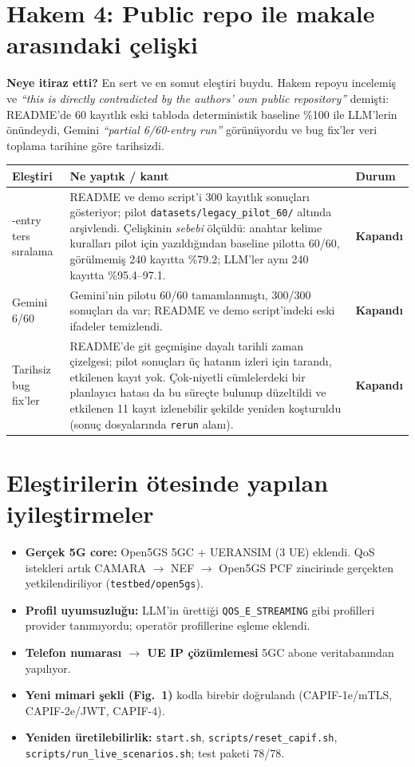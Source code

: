 \documentclass[10pt,a4paper]{article}
\newcommand{\ok}{\textcolor{green!50!black}{\textbf{Kapandı}}}
\newcommand{\q}[1]{\textit{``#1''}}
\begin{document}
\section{Hakem 4: Public repo ile makale arasındaki çelişki}
\textbf{Neye itiraz etti?} En sert ve en somut eleştiri buydu. Hakem repoyu incelemiş ve
\q{this is directly contradicted by the authors' own public repository} demişti: README'de 60 kayıtlık eski
tabloda deterministik baseline \%100 ile LLM'lerin önündeydi, Gemini \q{partial 6/60-entry run} görünüyordu ve
bug fix'ler veri toplama tarihine göre tarihsizdi.

\begin{tabularx}{\textwidth}{>{\raggedright\arraybackslash}p{3.6cm} L l}
\toprule
\textbf{Eleştiri} & \textbf{Ne yaptık / kanıt} & \textbf{Durum} \\
-entry ters sıralama &
README ve demo script'i 300 kayıtlık sonuçları gösteriyor; pilot \texttt{datasets/legacy\_pilot\_60/}
altında arşivlendi. Çelişkinin \emph{sebebi} ölçüldü: anahtar kelime kuralları pilot için yazıldığından baseline
pilotta 60/60, görülmemiş 240 kayıtta \%79.2; LLM'ler aynı 240 kayıtta \%95.4--97.1. & \ok \\
Gemini 6/60 &
Gemini'nin pilotu 60/60 tamamlanmıştı, 300/300 sonuçları da var; README ve demo script'indeki eski ifadeler
temizlendi. & \ok \\
Tarihsiz bug fix'ler &
README'de git geçmişine dayalı tarihli zaman çizelgesi; pilot sonuçları üç hatanın izleri için tarandı, etkilenen
kayıt yok. Çok-niyetli cümlelerdeki bir planlayıcı hatası da bu süreçte bulunup düzeltildi ve etkilenen 11 kayıt
izlenebilir şekilde yeniden koşturuldu (sonuç dosyalarında \texttt{rerun} alanı). & \ok \\
\bottomrule
\end{tabularx}

\section{Eleştirilerin ötesinde yapılan iyileştirmeler}
\begin{itemize}
\item \textbf{Gerçek 5G core:} Open5GS 5GC + UERANSIM (3 UE) eklendi. QoS istekleri artık
CAMARA $\rightarrow$ NEF $\rightarrow$ Open5GS PCF zincirinde gerçekten yetkilendiriliyor (\texttt{testbed/open5gs}).
\item \textbf{Profil uyumsuzluğu:} LLM'in ürettiği \texttt{QOS\_E\_STREAMING} gibi profilleri provider
tanımıyordu; operatör profillerine eşleme eklendi.
\item \textbf{Telefon numarası $\rightarrow$ UE IP çözümlemesi} 5GC abone veritabanından yapılıyor.
\item \textbf{Yeni mimari şekli (Fig.~1)} kodla birebir doğrulandı (CAPIF-1e/mTLS, CAPIF-2e/JWT, CAPIF-4).
\item \textbf{Yeniden üretilebilirlik:} \texttt{start.sh}, \texttt{scripts/reset\_capif.sh},
\texttt{scripts/run\_live\_scenarios.sh}; test paketi 78/78.
\end{itemize}
\end{document}
